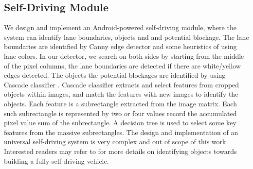 \subsection{Self-Driving Module}

We design and implement an Android-powered self-driving module, 
where the system can identify lane boundaries, objects and
and potential blockage. 
The lane boundaries are identified by Canny edge detector
\cite{canny1987computational} and some heuristics of 
using lane colors. 
In our detector, we search on both sides by starting from the 
middle of the pixel columns, the lane boundaries are detected if there are
white/yellow edges detected.
The objects the potential blockages are identified by using
Cascade classifier \cite{viola2001rapid}. 
Cascade classifier extracts and select features from cropped objects within images, 
and match the features with new images to identify the objects.    
Each feature is a subrectangle extracted from the image matrix. 
Each such subrectangle is represented by two or four values record 
the accumulated pixel value sum of the subrectangle.
A decision tree is used to select some key features from the massive
subrectangles. 
The design and implementation of an universal self-driving system is very
complex and out of scope of this work. 
Interested readers may refer to \cite{waymo, canny1987computational, viola2001rapid} for more
details on identifying objects towards building a fully self-driving vehicle. 

 




